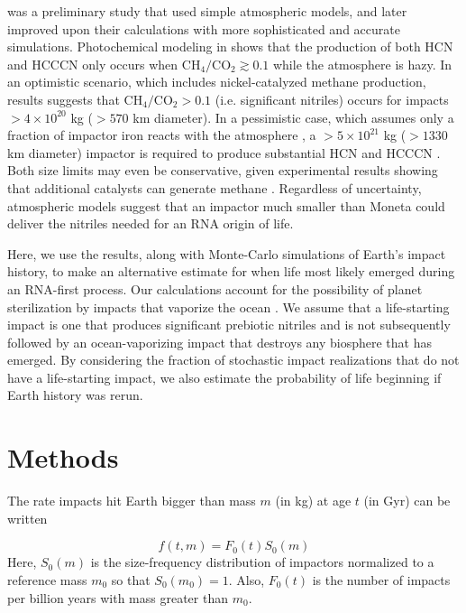 \documentclass[manuscript]{aastex63}
\begin{document}
\citet{Zahnle_2020} was a preliminary study that used simple atmospheric models, and later \citet{Wogan_2023} improved upon their calculations with more sophisticated and accurate simulations. Photochemical modeling in \citet{Wogan_2023} shows that the production of both HCN and HCCCN only occurs when $\mathrm{CH_4} / \mathrm{CO_2} \gtrsim 0.1$ while the atmosphere is hazy. In an optimistic scenario, which includes nickel-catalyzed methane production, results suggests that $\mathrm{CH_4} / \mathrm{CO_2} > 0.1$ (i.e. significant nitriles) occurs for impacts $> 4 \times 10^{20}$ kg ($> 570$ km diameter). In a pessimistic case, which assumes only a fraction of impactor iron reacts with the atmosphere \citep{Citron_2022}, a $> 5 \times 10^{21}$ kg ($> 1330$ km diameter) impactor is required to produce substantial HCN and HCCCN \citep{Wogan_2023}. Both size limits may even be conservative, given experimental results showing that additional catalysts can generate methane \citep{Hill_2003,Nuth_2016,Nuth_2020}. Regardless of uncertainty, atmospheric models suggest that an impactor much smaller than Moneta could deliver the nitriles needed for an RNA origin of life.

Here, we use the \citet{Wogan_2023} results, along with Monte-Carlo simulations of Earth's impact history, to make an alternative estimate for when life most likely emerged during an RNA-first process. Our calculations account for the possibility of planet sterilization by impacts that vaporize the ocean \citep{Sleep_1989}. We assume that a life-starting impact is one that produces significant prebiotic nitriles and is not subsequently followed by an ocean-vaporizing impact that destroys any biosphere that has emerged. By considering the fraction of stochastic impact realizations that do not have a life-starting impact, we also estimate the probability of life beginning if Earth history was rerun.

\section{Methods} \label{sec:methods}
The rate impacts hit Earth bigger than mass $m$ (in kg) at age $t$ (in Gyr) can be written

\begin{equation}
  f(t,m) = F_0(t) S_0(m)
\end{equation}
Here, $S_0(m)$ is the size-frequency distribution of impactors normalized to a reference mass $m_0$ so that $S_0(m_0) = 1$. Also, $F_0(t)$ is the number of impacts per billion years with mass greater than $m_0$.
\end{document}

